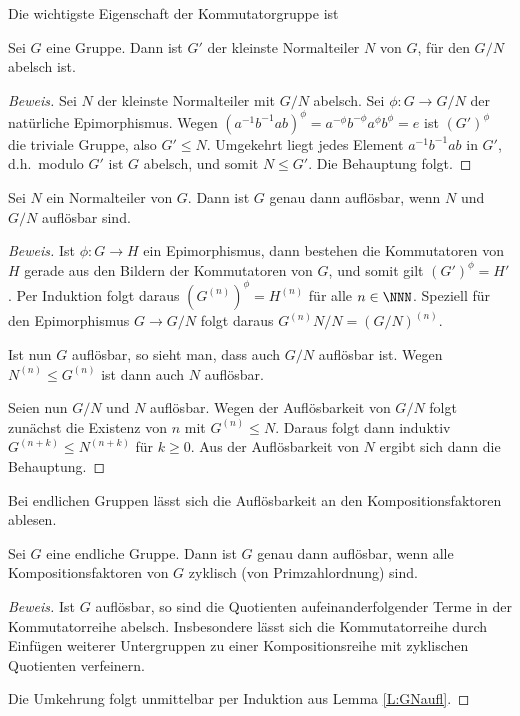 \documentclass[12pt,a4paper,twoside]{article}
\begin{document}
Die wichtigste Eigenschaft der Kommutatorgruppe ist
\begin{Satz}
  Sei $G$ eine Gruppe. Dann ist $G'$ der kleinste Normalteiler $N$ von $G$,
  f\"ur den $G/N$ abelsch ist.
\end{Satz}
\begin{proof}[Beweis]
  Sei $N$ der kleinste Normalteiler mit $G/N$ abelsch. Sei $\phi:G\to G/N$ der
  nat\"urliche Epimorphismus. Wegen
  $(a^{-1}b^{-1}ab)^\phi=a^{-\phi}b^{-\phi}a^\phi b^\phi=e$ ist $(G')^\phi$
  die triviale Gruppe, also $G'\le N$. Umgekehrt liegt jedes Element
  $a^{-1}b^{-1}ab$ in $G'$, d.h.\ modulo $G'$ ist $G$ abelsch, und somit $N\le
  G'$. Die Behauptung folgt.
\end{proof}
\begin{Lemma}\label{L:GNaufl}
  Sei $N$ ein Normalteiler von $G$. Dann ist $G$ genau dann aufl\"osbar, wenn
  $N$ und $G/N$ aufl\"osbar sind.
\end{Lemma}
\begin{proof}[Beweis]
  Ist $\phi:G\to H$ ein Epimorphismus, dann bestehen die Kommutatoren von $H$
  gerade aus den Bildern der Kommutatoren von $G$, und somit gilt
  $(G')^\phi=H'$. Per Induktion folgt daraus $(G^{(n)})^\phi=H^{(n)}$ f\"ur
  alle $n\in\NNN$. Speziell f\"ur den Epimorphismus $G\to G/N$ folgt daraus
  $G^{(n)}N/N=(G/N)^{(n)}$.

Ist nun $G$ aufl\"osbar, so sieht man, dass auch $G/N$ aufl\"osbar ist. Wegen
$N^{(n)}\le G^{(n)}$ ist dann auch $N$ aufl\"osbar.

Seien nun $G/N$ und $N$ aufl\"osbar. Wegen der Aufl\"osbarkeit von $G/N$ folgt
zun\"achst die Existenz von $n$ mit $G^{(n)}\le N$. Daraus folgt dann induktiv
$G^{(n+k)}\le N^{(n+k)}$ f\"ur $k\ge0$. Aus der Aufl\"osbarkeit von $N$ ergibt
sich dann die Behauptung.
\end{proof}
Bei endlichen Gruppen l\"asst sich die Aufl\"osbarkeit an den
Kompositionsfaktoren ablesen. 
\begin{Satz}
  Sei $G$ eine endliche Gruppe. Dann ist $G$ genau dann aufl\"osbar, wenn alle
  Kompositionsfaktoren von $G$ zyklisch (von Primzahlordnung) sind.
\end{Satz}
\begin{proof}[Beweis]
  Ist $G$ aufl\"osbar, so sind die Quotienten aufeinanderfolgender Terme in
  der Kommutatorreihe abelsch. Insbesondere l\"asst sich die Kommutatorreihe
  durch Einf\"ugen weiterer Untergruppen zu einer Kompositionsreihe mit
  zyklischen Quotienten verfeinern.
  
  Die Umkehrung folgt unmittelbar per Induktion aus Lemma \ref{L:GNaufl}.
\end{proof}
\end{document}
